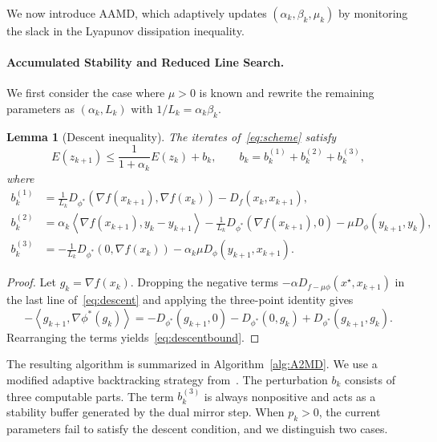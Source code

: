 \documentclass{article}
\newcommand{\dual}[1]{\left\langle {#1} \right\rangle}
\theoremstyle{plain}
\newtheorem{lemma}[theorem]{Lemma}
\theoremstyle{definition}
\theoremstyle{remark}
\begin{document}
We now introduce AAMD, which adaptively updates $(\alpha_k,\beta_k,\mu_k)$ by monitoring the slack in the Lyapunov dissipation inequality.

\paragraph{Accumulated Stability and Reduced Line Search.}
We first consider the case where $\mu>0$ is known and rewrite the remaining parameters as $(\alpha_k,L_k)$ with $1/L_k=\alpha_k\beta_k$.


\begin{lemma}[Descent inequality]\label{lem:descent}
The iterates of~\eqref{eq:scheme} satisfy
\begin{equation}\label{eq:descentbound}
E(z_{k+1})\le \frac{1}{1+\alpha_k}E(z_k)+b_k,
\qquad
b_k=b_k^{(1)}+b_k^{(2)}+b_k^{(3)},
\end{equation}
where
\begin{subequations}\label{eq:residuals}
\begin{align}
b_k^{(1)}
&=
\frac{1}{L_k}D_{\phi^*}(\nabla f(x_{k+1}),\nabla f(x_k))
-
D_f(x_k,x_{k+1}),
\\
b_k^{(2)}
&=
\alpha_k\dual{\nabla f(x_{k+1}),y_k-y_{k+1}}
-
\frac{1}{L_k}D_{\phi^*}(\nabla f(x_{k+1}),0)
-
\mu D_\phi(y_{k+1},y_k),
\\
b_k^{(3)}
&=
-\frac{1}{L_k}D_{\phi^*}(0,\nabla f(x_k))
-
\alpha_k\mu D_\phi(y_{k+1},x_{k+1}).
\end{align}
\end{subequations}
\end{lemma}

\begin{proof}
Let $g_k=\nabla f(x_k)$. Dropping the negative terms $-\alpha D_{f-\mu\phi}(x^\star,x_{k+1})$ in the last line of~\eqref{eq:descent} and applying the three-point identity gives
$$
-\dual{g_{k+1},\nabla\phi^*(g_k)}
=
-D_{\phi^*}(g_{k+1},0)
-D_{\phi^*}(0,g_k)
+
D_{\phi^*}(g_{k+1},g_k).
$$
Rearranging the terms yields~\eqref{eq:descentbound}.
\end{proof}

The resulting algorithm is summarized in Algorithm~\ref{alg:A2MD}. We use a modified adaptive backtracking strategy from~\cite{cavalcanti2024adaptive}. The perturbation $b_k$ consists of three computable parts. The term $b_k^{(3)}$ is always nonpositive and acts as a stability buffer generated by the dual mirror step. When $p_k>0$, the current parameters fail to satisfy the descent condition, and we distinguish two cases. 
\end{document}
